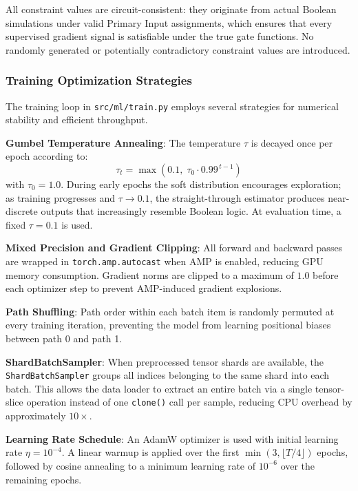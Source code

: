 \documentclass[conference]{IEEEtran}
\begin{document}
All constraint values are circuit-consistent: they originate from actual Boolean simulations under valid Primary Input assignments, which ensures that every supervised gradient signal is satisfiable under the true gate functions. No randomly generated or potentially contradictory constraint values are introduced.

\subsubsection{Training Optimization Strategies}
\label{sec:training_opt}
The training loop in \texttt{src/ml/train.py} employs several strategies for numerical stability and efficient throughput.

\textbf{Gumbel Temperature Annealing}: The temperature $\tau$ is decayed once per epoch according to:
\begin{equation}
   \tau_t = \max(0.1,\;\tau_0 \cdot 0.99^{\,t-1})
\end{equation}
with $\tau_0 = 1.0$. During early epochs the soft distribution encourages exploration; as training progresses and $\tau \to 0.1$, the straight-through estimator produces near-discrete outputs that increasingly resemble Boolean logic. At evaluation time, a fixed $\tau = 0.1$ is used.

\textbf{Mixed Precision and Gradient Clipping}: All forward and backward passes are wrapped in \texttt{torch.amp.autocast} when AMP is enabled, reducing GPU memory consumption. Gradient norms are clipped to a maximum of $1.0$ before each optimizer step to prevent AMP-induced gradient explosions.

\textbf{Path Shuffling}: Path order within each batch item is randomly permuted at every training iteration, preventing the model from learning positional biases between path 0 and path 1.

\textbf{ShardBatchSampler}: When preprocessed tensor shards are available, the \texttt{ShardBatchSampler} groups all indices belonging to the same shard into each batch. This allows the data loader to extract an entire batch via a single tensor-slice operation instead of one \texttt{clone()} call per sample, reducing CPU overhead by approximately $10\times$.

\textbf{Learning Rate Schedule}: An AdamW optimizer is used with initial learning rate $\eta = 10^{-4}$. A linear warmup is applied over the first $\min(3, \lfloor T/4 \rfloor)$ epochs, followed by cosine annealing to a minimum learning rate of $10^{-6}$ over the remaining epochs.
\end{document}
